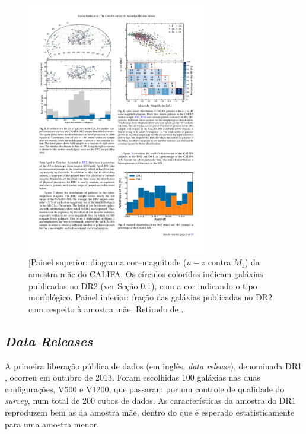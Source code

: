 \begin{figure}
	\includegraphics[width=0.7\textwidth]{figuras/CALIFACMD}
	\caption[Diagrama cor--magnitude da amostra mãe do CALIFA]
	{[Painel superior: diagrama cor--magnitude ($u-z$ contra $M_z$) da amostra mãe
	do CALIFA. Os círculos coloridos indicam galáxias publicadas no DR2 (ver Seção
	\ref{sec:ifs:dr}), com a cor indicando o tipo morfológico. Painel inferior:
	fração das galáxias publicadas no DR2 com respeito à amostra mãe. Retirado de
	\citet{GarciaBenito2015}.}
	\label{fig:CALIFACMD}
\end{figure}

\subsection{{\em Data Releases}}
\label{sec:ifs:dr}

A primeira liberação pública de dados (em inglês, {\em data release}),
denominada DR1 \citep{Husemann2013}, ocorreu em outubro de 2013. Foram
escolhidas 100 galáxias nas duas configurações, V500 e V1200, que passaram por
um controle de qualidade do {\em survey}, num total de 200 cubos de dados. As
características da amostra do DR1 reproduzem bem as da amostra mãe, dentro do
que é esperado estatisticamente para uma amostra menor.

